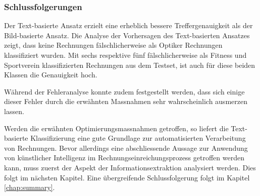 \subsubsection{Schlussfolgerungen}

Der Text-basierte Ansatz erzielt eine erheblich bessere Treffergenauigkeit als der Bild-basierte Ansatz. Die Analyse der Vorhersagen des Text-basierten Ansatzes zeigt, dass keine Rechnungen fälschlicherweise als Optiker Rechnungen klassifiziert wurden. Mit sechs respektive fünf fälschlicherweise als Fitness und Sportverein klassifizierten Rechnungen aus dem Testset, ist auch für diese beiden Klassen die Genauigkeit hoch. 


Während der Fehleranalyse konnte zudem festgestellt werden, dass sich einige dieser Fehler durch die erwähnten Massnahmen sehr wahrscheinlich ausmerzen lassen.

Werden die erwähnten Optimierungsmassnahmen getroffen, so liefert die Text-basierte Klassifizierung eine gute Grundlage zur automatisierten Verarbeitung von Rechnungen. Bevor allerdings eine abschliessende Aussage zur Anwendung von künstlicher Intelligenz im Rechnungseinreichungsprozess getroffen werden kann, muss zuerst der Aspekt der Informationsextraktion analysiert werden. Dies folgt im nächsten Kapitel. Eine übergreifende Schlussfolgerung folgt im Kapitel \ref{chap:summary}.
